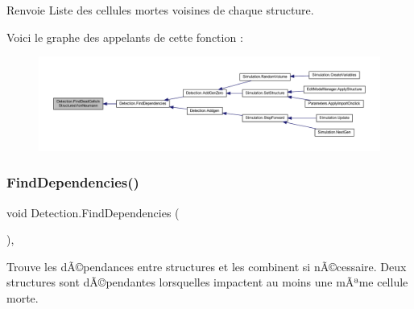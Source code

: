 \begin{DoxyReturn}{Renvoie}
Liste des cellules mortes voisines de chaque structure.
\end{DoxyReturn}
Voici le graphe des appelants de cette fonction \+:
\nopagebreak
\begin{figure}[H]
\begin{center}
\leavevmode
\includegraphics[width=350pt]{class_detection_aeea8bac4d15d3dd92d6b907b357c1680_icgraph}
\end{center}
\end{figure}
\mbox{\label{class_detection_a0f5d7b85c0daaf07503132a2faa23bcf}} 
\subsubsection{\texorpdfstring{Find\+Dependencies()}{FindDependencies()}}
{\footnotesize\ttfamily void Detection.\+Find\+Dependencies (\begin{DoxyParamCaption}{ }\end{DoxyParamCaption})\hspace{0.3cm}{\ttfamily [inline]}, {\ttfamily [private]}}



Trouve les dÃ©pendances entre structures et les combinent si nÃ©cessaire. Deux structures sont dÃ©pendantes lorsqu\textquotesingle{}elles impactent au moins une mÃªme cellule morte. 

